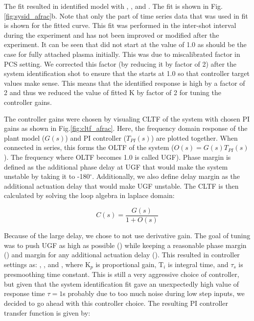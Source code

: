 The fit resulted in identified model with \AfracK, \AfracTau, and \AfracL.
The fit is shown in Fig.\ref{fig:sysid_afrac}b.
Note that only the part of time series data that was used in fit is shown for the fitted curve.
This fit was performed in the inter-shot interval during the experiment and has not been improved or modified after the experiment.
It can be seen that \Afrac did not start at the value of 1.0 as should be the case for fully attached plasma initially.
This was due to miscalibrated factor in PCS setting.
We corrected this factor (by reducing it by factor of 2) after the system identification shot to ensure that the \Afrac starts at 1.0 so that controller target values make sense.
This means that the identified response is high by a factor of 2 and thus we reduced the value of fitted K by factor of 2 for tuning the controller gains.

The controller gains were chosen by visualing \ac{CLTF} of the system with chosen PI gains as shown in Fig.\ref{fig:cltf_afrac}.
Here, the frequency domain response of the plant model ($G(s)$) and PI controller ($T_{PI}(s)$) are plotted together.
When connected in series, this forms the \ac{OLTF} of the system ($O(s) = G(s) T_{PI}(s)$).
The frequency where \ac{OLTF} becomes 1.0 is called \ac{UGF}).
Phase margin is defined as the additional phase delay at \ac{UGF} that would make the system unstable by taking it to -180$^\circ$.
Additionally, we also define delay margin as the additional actuation delay that would make \ac{UGF} unstable.
The \ac{CLTF} is then calculated by solving the loop algebra in laplace domain:

\begin{equation}
    C(s) = \frac{G(s)}{1 + O(s)}
\label{eq:cltf}
\end{equation}

Because of the large delay, we chose to not use derivative gain.
The goal of tuning was to push \ac{UGF} as high as possible (\AfracUGF) while keeping a reasonable phase margin (\AfracPhaseMargin) and margin for any additional actuation delay (\AfracDelayMargin).
This resulted in controller settings as: \AfracKp, \AfracTi, and \Afracstau, where K$_p$ is proportional gain, T$_i$ is integral time, and $\tau_s$ is presmoothing time constant.
This is still a very aggressive choice of controller, but given that the system identification fit gave an unexpectedly high value of response time $\tau=1$s probably due to too much noise during low step inputs, we decided to go ahead with this controller choice.
The resulting PI controller transfer function is given by:


